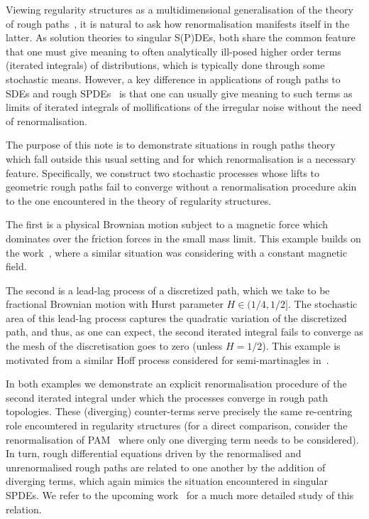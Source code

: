 \documentclass{article}
\begin{document}
Viewing regularity structures as a multidimensional generalisation of the theory of rough paths~\cite{Lyons98}, it is natural to ask how renormalisation manifests itself in the latter. As solution theories to singular S(P)DEs, both share the common feature that one must give meaning to often analytically ill-posed higher order terms (iterated integrals) of distributions, which is typically done through some stochastic means. However, a key difference in applications of rough paths to SDEs and rough SPDEs~\cite{FrizVictoir10} is that one can usually give meaning to such terms as limits of iterated integrals of mollifications of the irregular noise without the need of renormalisation.

The purpose of this note is to demonstrate situations in rough paths theory which fall outside this usual setting and for which renormalisation is a necessary feature. Specifically, we construct two stochastic processes whose lifts to geometric rough paths fail to converge without a renormalisation procedure akin to the one encountered in the theory of regularity structures.

The first is a physical Brownian motion subject to a magnetic force which dominates over the friction forces in the small mass limit. This example builds on the work~\cite{FrizGassiat15}, where a similar situation was considering with a constant magnetic field.

The second is a lead-lag process of a discretized path, which we take to be fractional Brownian motion with Hurst parameter $H \in (1/4,1/2]$. The stochastic area of this lead-lag process captures the quadratic variation of the discretized path, and thus, as one can expect, the second iterated integral fails to converge as the mesh of the discretisation goes to zero (unless $H=1/2$). This example is motivated from a similar Hoff process considered for semi-martinagles in~\cite{Flint16}.

In both examples we demonstrate an explicit renormalisation procedure of the second iterated integral under which the processes converge in rough path topologies. These (diverging) counter-terms serve precisely the same re-centring role encountered in regularity structures (for a direct comparison, consider the renormalisation of PAM~\cite{Hairer14,GIP15} where only one diverging term needs to be considered). In turn, rough differential equations driven by the renormalised and unrenormalised rough paths are related to one another by the addition of diverging terms, which again mimics the situation encountered in singular SPDEs. We refer to the upcoming work~\cite{Bruned16} for a much more detailed study of this relation.
\end{document}
